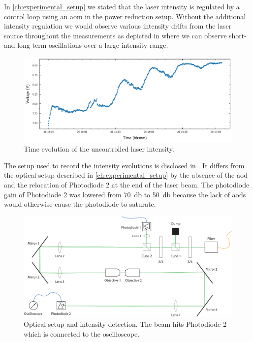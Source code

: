 In \cref{ch:experimental_setup} we stated that the laser intensity is
regulated by a control loop using an \gls{aom} in the power reduction setup.
Without the additional intensity regulation we would
observe various intensity drifts from the laser source throughout the
measurements as depicted in  where we can
observe short- and long-term oscillations over a large intensity range.
\begin{figure}[htb]
  \centering
  \includegraphics[width=\textwidth]
  {../figure/intensity/control/uncontrolled.pdf}
  \caption{Time evolution of the uncontrolled laser intensity.
  }\label{fig:intensity_uncontrolled}
\end{figure}
The setup used to record the intensity evolutions is disclosed in
. It differs from the optical setup
described in \cref{ch:experimental_setup} by the absence of the \gls{aod}
and the relocation of Photodiode 2 at the end of the laser beam. The
photodiode gain of Photodiode 2 was lowered from \SI{70}{\decibel} to
\SI{50}{\decibel} because the lack of \gls{aod}s would otherwise cause the
photodiode to saturate.
\begin{figure}[htb]
  \centering
  \includegraphics[width=.9\textwidth]{../media/setup/intensity-control.pdf}
  \caption{Optical setup and intensity detection. The beam hits Photodiode 2
    which is connected to the oscilloscope.
  }\label{fig:intensity_control_setup}
\end{figure}
